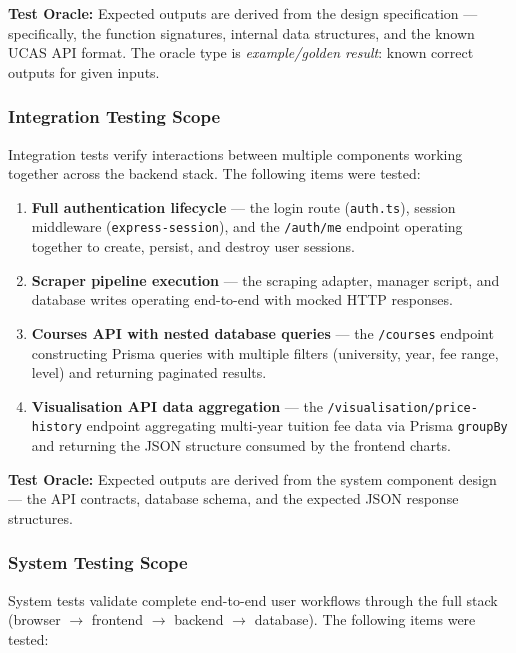 \noindent\textbf{Test Oracle:} Expected outputs are derived from the design specification --- specifically, the function signatures, internal data structures, and the known UCAS API format. The oracle type is \textit{example/golden result}: known correct outputs for given inputs.

\subsubsection*{Integration Testing Scope}

Integration tests verify interactions between multiple components working together across the backend stack. The following items were tested:

\begin{enumerate}
    \item \textbf{Full authentication lifecycle} --- the login route (\texttt{auth.ts}), session middleware (\texttt{express-session}), and the \texttt{/auth/me} endpoint operating together to create, persist, and destroy user sessions.
    \item \textbf{Scraper pipeline execution} --- the scraping adapter, manager script, and database writes operating end-to-end with mocked HTTP responses.
    \item \textbf{Courses API with nested database queries} --- the \texttt{/courses} endpoint constructing Prisma queries with multiple filters (university, year, fee range, level) and returning paginated results.
    \item \textbf{Visualisation API data aggregation} --- the \texttt{/visualisation/price-history} endpoint aggregating multi-year tuition fee data via Prisma \texttt{groupBy} and returning the JSON structure consumed by the frontend charts.
\end{enumerate}

\noindent\textbf{Test Oracle:} Expected outputs are derived from the system component design --- the API contracts, database schema, and the expected JSON response structures.

\subsubsection*{System Testing Scope}

System tests validate complete end-to-end user workflows through the full stack (browser $\rightarrow$ frontend $\rightarrow$ backend $\rightarrow$ database). The following items were tested:

